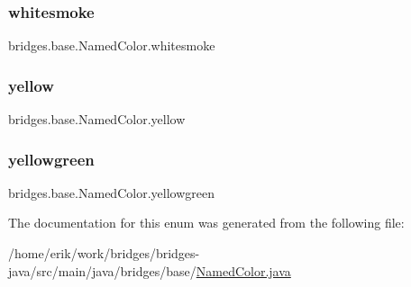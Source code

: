 \subsubsection{\texorpdfstring{whitesmoke}{whitesmoke}}
{\footnotesize\ttfamily bridges.\+base.\+Named\+Color.\+whitesmoke}

\mbox{\label{enumbridges_1_1base_1_1_named_color_aaecc9a80f5e566148c7d448424532d95}} 
\subsubsection{\texorpdfstring{yellow}{yellow}}
{\footnotesize\ttfamily bridges.\+base.\+Named\+Color.\+yellow}

\mbox{\label{enumbridges_1_1base_1_1_named_color_a263dc51f00db00ef12d4f24cc2c6ee5c}} 
\subsubsection{\texorpdfstring{yellowgreen}{yellowgreen}}
{\footnotesize\ttfamily bridges.\+base.\+Named\+Color.\+yellowgreen}



The documentation for this enum was generated from the following file\+:\begin{DoxyCompactItemize}
\item 
/home/erik/work/bridges/bridges-\/java/src/main/java/bridges/base/\hyperlink{_named_color_8java}{Named\+Color.\+java}\end{DoxyCompactItemize}
